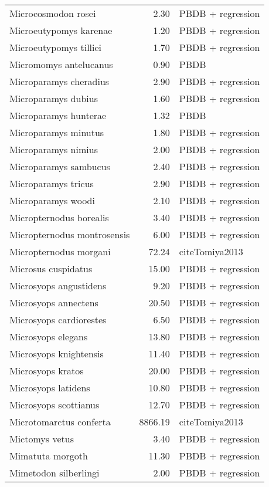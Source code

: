 \begin{table}[ht]
\begin{tabular}{lrl}
  Microcosmodon rosei & 2.30 & PBDB + regression \\ 
  Microeutypomys karenae & 1.20 & PBDB + regression \\ 
  Microeutypomys tilliei & 1.70 & PBDB + regression \\ 
  Micromomys antelucanus & 0.90 & PBDB \\ 
  Microparamys cheradius & 2.90 & PBDB + regression \\ 
  Microparamys dubius & 1.60 & PBDB + regression \\ 
  Microparamys hunterae & 1.32 & PBDB \\ 
  Microparamys minutus & 1.80 & PBDB + regression \\ 
  Microparamys nimius & 2.00 & PBDB + regression \\ 
  Microparamys sambucus & 2.40 & PBDB + regression \\ 
  Microparamys tricus & 2.90 & PBDB + regression \\ 
  Microparamys woodi & 2.10 & PBDB + regression \\ 
  Micropternodus borealis & 3.40 & PBDB + regression \\ 
  Micropternodus montrosensis & 6.00 & PBDB + regression \\ 
  Micropternodus morgani & 72.24 & cite{Tomiya2013} \\ 
  Microsus cuspidatus & 15.00 & PBDB + regression \\ 
  Microsyops angustidens & 9.20 & PBDB + regression \\ 
  Microsyops annectens & 20.50 & PBDB + regression \\ 
  Microsyops cardiorestes & 6.50 & PBDB + regression \\ 
  Microsyops elegans & 13.80 & PBDB + regression \\ 
  Microsyops knightensis & 11.40 & PBDB + regression \\ 
  Microsyops kratos & 20.00 & PBDB + regression \\ 
  Microsyops latidens & 10.80 & PBDB + regression \\ 
  Microsyops scottianus & 12.70 & PBDB + regression \\ 
  Microtomarctus conferta & 8866.19 & cite{Tomiya2013} \\ 
  Mictomys vetus & 3.40 & PBDB + regression \\ 
  Mimatuta morgoth & 11.30 & PBDB + regression \\ 
  Mimetodon silberlingi & 2.00 & PBDB + regression \\ 

\end{tabular}
\end{table}
